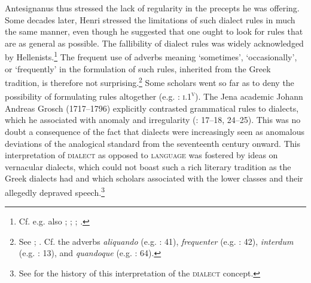 Antesignanus thus stressed the lack of regularity in the precepts he was offering. Some decades later, Henri \citet[46--47]{Estienne1581} stressed the limitations of such dialect rules in much the same manner, even though he suggested that one ought to look for rules that are as general as possible. The fallibility of dialect rules was widely acknowledged by Hellenists.\footnote{{Cf. e.g. also \citet[38--39]{Schmidt1604}; \citet[2]{Heupel1712}; \citet[1136, 1139]{[frisch]1730}; \citet[299]{Jehne1782}.}} The frequent use of adverbs meaning ‘sometimes’, ‘occasionally’, or ‘frequently’ in the formulation of such rules, inherited from the Greek tradition, is therefore not surprising.\footnote{{See \citet[53]{Forstel1999}; \citet[516]{VanRooy2014}. Cf. the adverbs} {\textit{aliquando}} {(e.g. \citealt{Walper1589}: 41),} {\textit{frequenter}} {(e.g. \citealt{Walper1589}: 42),} {\textit{interdum}} {(e.g. \citealt{Antesignanus1554}: 13),}{ }{and} {\textit{quandoque}} {(e.g. \citealt{Walper1589}: 64).}} Some scholars went so far as to deny the possibility of formulating rules altogether (e.g. \citealt{Camden1595}: \textsc{i}.1\textsc{\textsuperscript{v}}). The Jena academic Johann Andreas Grosch (1717–1796) explicitly contrasted grammatical rules to dialects, which he associated with anomaly and irregularity (\citealt{Grosch1753}: 17–18, 24–25). This was no doubt a consequence of the fact that dialects were increasingly seen as anomalous deviations of the analogical standard from the seventeenth century onward. This interpretation of \textsc{dialect} as opposed to \textsc{language} was fostered by ideas on vernacular dialects, which could not boast such a rich literary tradition as the Greek dialects had and which scholars associated with the lower classes and their allegedly depraved speech.\footnote{{See \citet[]{VanRooyFcd} for the history of this interpretation of the} {\textsc{dialect}} {concept.}}

